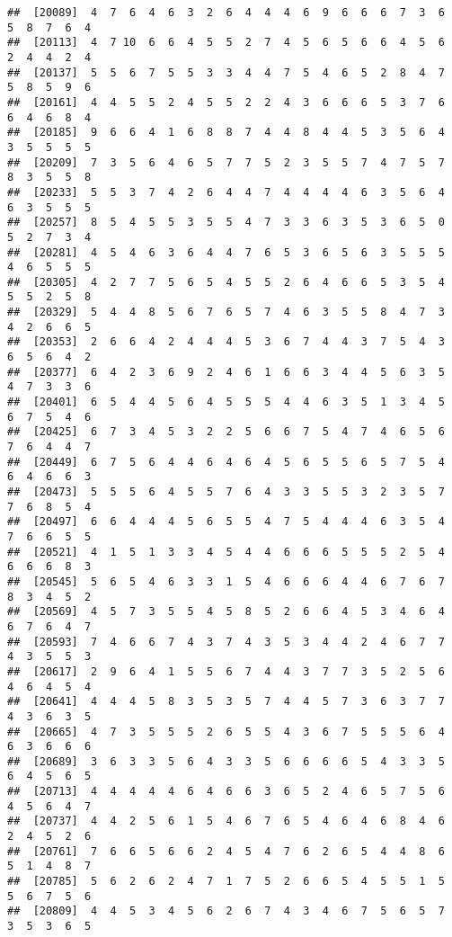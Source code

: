 \documentclass[
]{book}
\begin{document}
\begin{verbatim}
##  [20089]  4  7  6  4  6  3  2  6  4  4  4  6  9  6  6  6  7  3  6  5  8  7  6  4
##  [20113]  4  7 10  6  6  4  5  5  2  7  4  5  6  5  6  6  4  5  6  2  4  4  2  4
##  [20137]  5  5  6  7  5  5  3  3  4  4  7  5  4  6  5  2  8  4  7  5  8  5  9  6
##  [20161]  4  4  5  5  2  4  5  5  2  2  4  3  6  6  6  5  3  7  6  6  4  6  8  4
##  [20185]  9  6  6  4  1  6  8  8  7  4  4  8  4  4  5  3  5  6  4  3  5  5  5  5
##  [20209]  7  3  5  6  4  6  5  7  7  5  2  3  5  5  7  4  7  5  7  8  3  5  5  8
##  [20233]  5  5  3  7  4  2  6  4  4  7  4  4  4  4  6  3  5  6  4  6  3  5  5  5
##  [20257]  8  5  4  5  5  3  5  5  4  7  3  3  6  3  5  3  6  5  0  5  2  7  3  4
##  [20281]  4  5  4  6  3  6  4  4  7  6  5  3  6  5  6  3  5  5  5  4  6  5  5  5
##  [20305]  4  2  7  7  5  6  5  4  5  5  2  6  4  6  6  5  3  5  4  5  5  2  5  8
##  [20329]  5  4  4  8  5  6  7  6  5  7  4  6  3  5  5  8  4  7  3  4  2  6  6  5
##  [20353]  2  6  6  4  2  4  4  4  5  3  6  7  4  4  3  7  5  4  3  6  5  6  4  2
##  [20377]  6  4  2  3  6  9  2  4  6  1  6  6  3  4  4  5  6  3  5  4  7  3  3  6
##  [20401]  6  5  4  4  5  6  4  5  5  5  4  4  6  3  5  1  3  4  5  6  7  5  4  6
##  [20425]  6  7  3  4  5  3  2  2  5  6  6  7  5  4  7  4  6  5  6  7  6  4  4  7
##  [20449]  6  7  5  6  4  4  6  4  6  4  5  6  5  5  6  5  7  5  4  6  4  6  6  3
##  [20473]  5  5  5  6  4  5  5  7  6  4  3  3  5  5  3  2  3  5  7  7  6  8  5  4
##  [20497]  6  6  4  4  4  5  6  5  5  4  7  5  4  4  4  6  3  5  4  7  6  6  5  5
##  [20521]  4  1  5  1  3  3  4  5  4  4  6  6  6  5  5  5  2  5  4  6  6  6  8  3
##  [20545]  5  6  5  4  6  3  3  1  5  4  6  6  6  4  4  6  7  6  7  8  3  4  5  2
##  [20569]  4  5  7  3  5  5  4  5  8  5  2  6  6  4  5  3  4  6  4  6  7  6  4  7
##  [20593]  7  4  6  6  7  4  3  7  4  3  5  3  4  4  2  4  6  7  7  4  3  5  5  3
##  [20617]  2  9  6  4  1  5  5  6  7  4  4  3  7  7  3  5  2  5  6  4  6  4  5  4
##  [20641]  4  4  4  5  8  3  5  3  5  7  4  4  5  7  3  6  3  7  7  4  3  6  3  5
##  [20665]  4  7  3  5  5  5  2  6  5  5  4  3  6  7  5  5  5  6  4  6  3  6  6  6
##  [20689]  3  6  3  3  5  6  4  3  3  5  6  6  6  6  5  4  3  3  5  6  4  5  6  5
##  [20713]  4  4  4  4  4  6  4  6  6  3  6  5  2  4  6  5  7  5  6  4  5  6  4  7
##  [20737]  4  4  2  5  6  1  5  4  6  7  6  5  4  6  4  6  8  4  6  2  4  5  2  6
##  [20761]  7  6  6  5  6  6  2  4  5  4  7  6  2  6  5  4  4  8  6  5  1  4  8  7
##  [20785]  5  6  2  6  2  4  7  1  7  5  2  6  6  5  4  5  5  1  5  5  6  7  5  6
##  [20809]  4  4  5  3  4  5  6  2  6  7  4  3  4  6  7  5  6  5  7  3  5  3  6  5

\end{verbatim}
\end{document}
